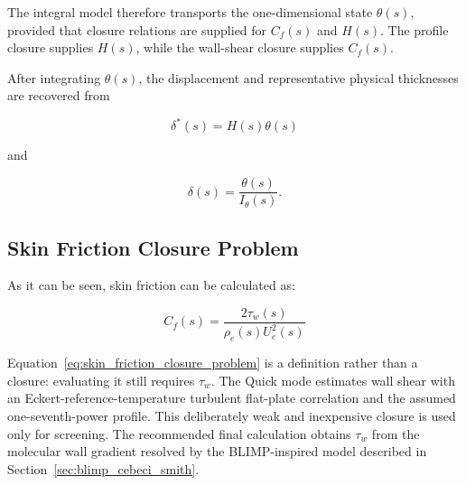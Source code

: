 The integral model therefore transports the one-dimensional state
\(\theta(s)\), provided that closure relations are supplied for \(C_f(s)\) and
\(H(s)\). The profile closure supplies \(H(s)\), while the wall-shear closure
supplies \(C_f(s)\).

After integrating \(\theta(s)\), the displacement and representative physical
thicknesses are recovered from

\begin{equation}
    \boxed{
    \delta^*(s)=H(s)\theta(s)
    }
\end{equation}

and

\begin{equation}
    \boxed{
    \delta(s)=\frac{\theta(s)}{I_\theta(s)}
    }.
\end{equation}

\subsection{Skin Friction Closure Problem}

As it can be seen, skin friction can be calculated as: 

\begin{equation}
    \boxed{
    C_f(s)
    =
    \frac{2\tau_w(s)}
         {\rho_e(s)U_e^2(s)}
    }
    \label{eq:skin_friction_coefficient}
\end{equation}

Equation~\eqref{eq:skin_friction_closure_problem} is a definition rather than a
closure: evaluating it still requires \(\tau_w\). The Quick mode estimates wall
shear with an Eckert-reference-temperature turbulent flat-plate correlation and
the assumed one-seventh-power profile. This deliberately weak and inexpensive
closure is used only for screening. The recommended final calculation obtains
\(\tau_w\) from the molecular wall gradient resolved by the BLIMP-inspired model
described in Section~\ref{sec:blimp_cebeci_smith}.
